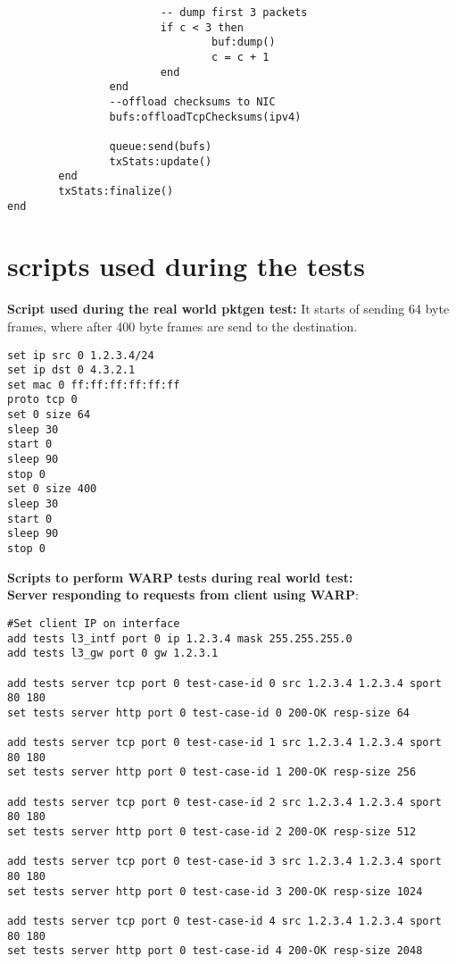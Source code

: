 \begin{landscape}
\begin{verbatim}
                        -- dump first 3 packets
                        if c < 3 then
                                buf:dump()
                                c = c + 1
                        end
                end
                --offload checksums to NIC
                bufs:offloadTcpChecksums(ipv4)

                queue:send(bufs)
                txStats:update()
        end
        txStats:finalize()
end

\end{verbatim}

\section{scripts used during the tests}\label{app:realworld}

\textbf{Script used during the real world pktgen test:}
It starts of sending 64 byte frames, where after 400 byte frames are send to the destination.

\begin{verbatim}
set ip src 0 1.2.3.4/24
set ip dst 0 4.3.2.1
set mac 0 ff:ff:ff:ff:ff:ff
proto tcp 0
set 0 size 64
sleep 30
start 0
sleep 90
stop 0
set 0 size 400
sleep 30
start 0
sleep 90
stop 0
\end{verbatim}

\textbf{Scripts to perform WARP tests during real world test:\\}
\textbf{Server responding to requests from client using WARP}:

\begin{verbatim}
#Set client IP on interface
add tests l3_intf port 0 ip 1.2.3.4 mask 255.255.255.0
add tests l3_gw port 0 gw 1.2.3.1 

add tests server tcp port 0 test-case-id 0 src 1.2.3.4 1.2.3.4 sport 80 180
set tests server http port 0 test-case-id 0 200-OK resp-size 64

add tests server tcp port 0 test-case-id 1 src 1.2.3.4 1.2.3.4 sport 80 180
set tests server http port 0 test-case-id 1 200-OK resp-size 256

add tests server tcp port 0 test-case-id 2 src 1.2.3.4 1.2.3.4 sport 80 180
set tests server http port 0 test-case-id 2 200-OK resp-size 512

add tests server tcp port 0 test-case-id 3 src 1.2.3.4 1.2.3.4 sport 80 180
set tests server http port 0 test-case-id 3 200-OK resp-size 1024

add tests server tcp port 0 test-case-id 4 src 1.2.3.4 1.2.3.4 sport 80 180
set tests server http port 0 test-case-id 4 200-OK resp-size 2048


\end{verbatim}
\end{landscape}

